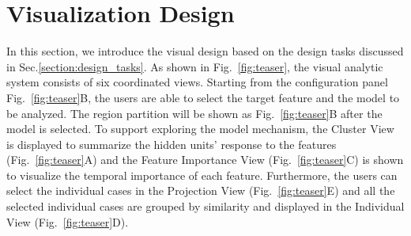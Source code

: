\section{Visualization Design}


In this section, we introduce the visual design based on the design tasks discussed in Sec.\ref{section:design_tasks}.  As shown in Fig.~\ref{fig:teaser}, the visual analytic system consists of six coordinated views. Starting from the configuration panel Fig.~\ref{fig:teaser}B, the users are able to select the target feature and the model to be analyzed. The region partition will be shown as Fig.~\ref{fig:teaser}B after the model is selected. To support exploring the model mechanism, the Cluster View is displayed to summarize the hidden units' response to the features (Fig.~\ref{fig:teaser}A) and the Feature Importance View (Fig.~\ref{fig:teaser}C) is shown to visualize the temporal importance of each feature. Furthermore, the users can select the individual cases in the Projection View (Fig.~\ref{fig:teaser}E) and all the selected individual cases are grouped by similarity and displayed in the Individual View (Fig.~\ref{fig:teaser}D).






